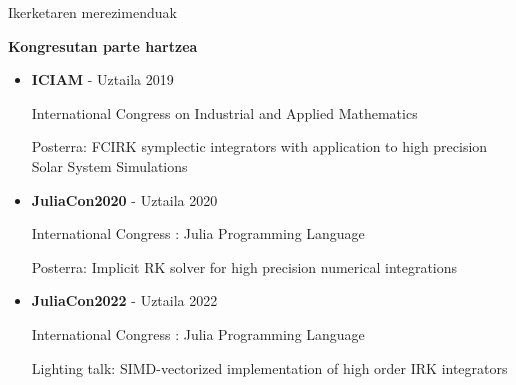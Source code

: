 \documentclass[
 10pt,%
 compress,%
 t,       %
 xcolor=svgnames
]{beamer}
\theoremstyle{definition} \newtheorem{definicion}{Definicion}[section]
\theoremstyle{propiedades} \newtheorem{propiedades}{Propiedades}[section]
\begin{document}
\begin{frame}{Ikerketaren merezimenduak} 

\medskip

\textbf{Kongresutan parte hartzea}

\small
\medskip
\begin{itemize}



\item \textbf{ICIAM} - Uztaila 2019

International Congress on Industrial and Applied Mathematics 

Posterra: FCIRK symplectic integrators  with application to high precision Solar System Simulations




\medskip
\item \textbf{JuliaCon2020} - Uztaila 2020

International Congress : Julia Programming Language 

Posterra: Implicit RK solver for high precision numerical integrations

\medskip
\item \textbf{JuliaCon2022} - Uztaila 2022 %

International Congress : Julia Programming Language 

Lighting talk:  SIMD-vectorized implementation of high
order IRK integrators

\end{itemize}



\end{frame}
\end{document}
